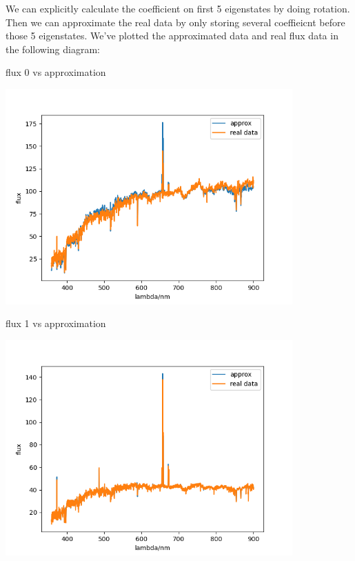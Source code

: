 \documentclass[letterpaper,12pt]{article}
\begin{document}
We can explicitly calculate the coefficient on first 5 eigenstates by doing rotation. Then we can approximate the real data by only storing several coeffieicnt before those 5 eigenstates. We've plotted the approximated data and real flux data in the following diagram:

\begin{table}[!h]
    \centering
    \caption{flux 0 vs approximation}
    \includegraphics[width=11cm]{7-7-0.png}
\end{table}%

\begin{table}[!h]
    \centering
    \caption{flux 1 vs approximation}
    \includegraphics[width=11cm]{7-7-1.png}
\end{table}%
\end{document}
